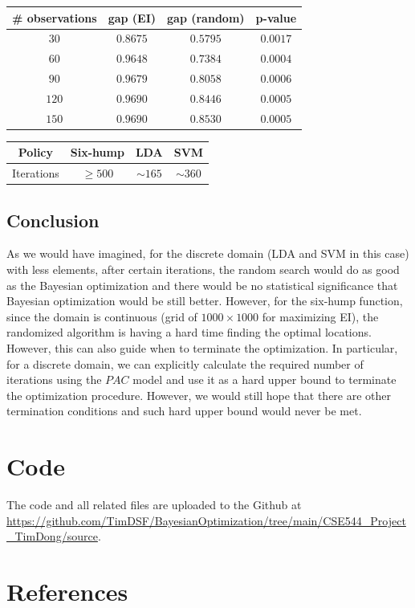 \documentclass[12pt,a4paper]{article}
\begin{document}
\begin{center}
\begin{tabular}{|c|c|c|c|}
\hline
\# observations & gap (EI) & gap (random) & p-value \\
\hline
 $30$ & $0.8675$ & $0.5795$ & $0.0017$ \\
\hline
 $60$ & $0.9648$ & $0.7384$ & $0.0004$ \\
\hline
 $90$ & $0.9679$ & $0.8058$ & $0.0006$ \\
\hline
$120$ & $0.9690$ & $0.8446$ & $0.0005$ \\
\hline
$150$ & $0.9690$ & $0.8530$ & $0.0005$ \\
\hline
\end{tabular}
\end{center}

\begin{center}
\begin{tabular}{|c|c|c|c|}
\hline
Policy & Six-hump & LDA & SVM \\
\hline
Iterations & $\geq500$ & $\sim165$ & $\sim360$ \\
\hline
\end{tabular}
\end{center}

\subsection{Conclusion}
As we would have imagined, for the discrete domain (LDA and SVM in this case) with less elements, after certain iterations, the random search would do as good as the Bayesian optimization and there would be no statistical significance that Bayesian optimization would be still better. However, for the six-hump function, since the domain is continuous (grid of $1000\times1000$ for maximizing EI), the randomized algorithm is having a hard time finding the optimal locations. \\
However, this can also guide when to terminate the optimization. In particular, for a discrete domain, we can explicitly calculate the required number of iterations using the $PAC$ model and use it as a hard upper bound to terminate the optimization procedure. However, we would still hope that there are other termination conditions and such hard upper bound would never be met.

\newpage

\section{Code}
The code and all related files are uploaded to the Github at \url{https://github.com/TimDSF/BayesianOptimization/tree/main/CSE544_Project_TimDong/source}.

\section{References}
\nocite{*}


\end{document}
